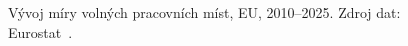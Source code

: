 \def\strStavVolnaMistaVyvojTitle{Míra volných pracovních míst}%
\def\strStavVolnaMistaVyvojYlabel{volná pracovní místa [\%]}%
\providecommand\NudgeStavVolnaMistaVyvojCz{2pt}%
\providecommand\NudgeStavVolnaMistaVyvojAt{0pt}%
\providecommand\NudgeStavVolnaMistaVyvojDe{0pt}%
\providecommand\NudgeStavVolnaMistaVyvojDk{0pt}%
\providecommand\NudgeStavVolnaMistaVyvojPl{6pt}%
\providecommand\NudgeStavVolnaMistaVyvojSk{0pt}%
\def\strStavVolnaMistaVyvojCaption{Vývoj míry volných pracovních míst, \acs{EU}, 2010--2025. Zdroj dat: Eurostat~\cite{eurostat_jvs_a_r21}.}%
%
\begin{figure}[htb]
  \centering
  
  \caption{\strStavVolnaMistaVyvojCaption}
  \label{fig:stav_volna_mista_vyvoj}
\end{figure}

